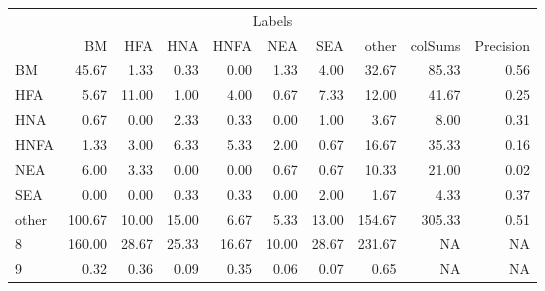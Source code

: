 \begin{table}
\centering\begingroup\fontsize{11}{13}\selectfont

\begin{tabular}{lrrrrrr>{}r|rr}
\toprule
\multicolumn{10}{c}{Labels} \\
\cmidrule(l{3pt}r{3pt}){1-10}
  & BM & HFA & HNA & HNFA & NEA & SEA & other & colSums & Precision\\
\midrule
BM & 45.67 & 1.33 & 0.33 & 0.00 & 1.33 & 4.00 & 32.67 & 85.33 & 0.56\\
HFA & 5.67 & 11.00 & 1.00 & 4.00 & 0.67 & 7.33 & 12.00 & 41.67 & 0.25\\
HNA & 0.67 & 0.00 & 2.33 & 0.33 & 0.00 & 1.00 & 3.67 & 8.00 & 0.31\\
HNFA & 1.33 & 3.00 & 6.33 & 5.33 & 2.00 & 0.67 & 16.67 & 35.33 & 0.16\\
NEA & 6.00 & 3.33 & 0.00 & 0.00 & 0.67 & 0.67 & 10.33 & 21.00 & 0.02\\
\addlinespace
SEA & 0.00 & 0.00 & 0.33 & 0.33 & 0.00 & 2.00 & 1.67 & 4.33 & 0.37\\
other & 100.67 & 10.00 & 15.00 & 6.67 & 5.33 & 13.00 & 154.67 & 305.33 & 0.51\\
8 & 160.00 & 28.67 & 25.33 & 16.67 & 10.00 & 28.67 & 231.67 & NA & NA\\
9 & 0.32 & 0.36 & 0.09 & 0.35 & 0.06 & 0.07 & 0.65 & NA & NA\\
\bottomrule
\end{tabular}
\endgroup{}
\end{table}
